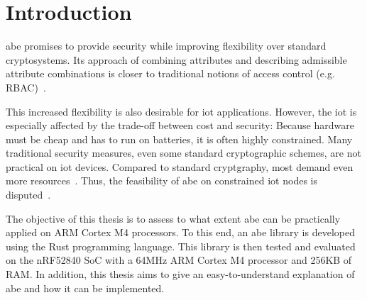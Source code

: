 
\chapter{Introduction}\label{chapter:introduction}





\acrfull{abe} promises to provide security while improving flexibility over standard cryptosystems.
Its approach of combining \glspl{attribute} and  describing admissible attribute combinations is closer to traditional notions of access control (e.g. RBAC)~\cite{bethencourt_ciphertext-policy_2007}. %

This increased flexibility is also desirable for \acrshort{iot} applications.
However, the \acrfull{iot} is especially affected by the trade-off between cost and security:
Because hardware must be cheap and has to run on batteries, it is often highly constrained.
Many traditional security measures, even some standard cryptographic schemes, are not practical on \acrshort{iot} devices.
Compared to standard cryptgraphy, most  demand even more resources~\cite{wang_performance_2014}.
Thus, the feasibility of \acrshort{abe} on constrained \acrshort{iot} nodes is disputed~\cite{wang_performance_2014,ambrosin_feasibility_2016,ambrosin_feasibility_2015,girgenti_feasibility_2019,borgh_attribute-based_2016}.

The objective of this thesis is to assess to what extent \acrshort{abe} can be practically applied on ARM Cortex M4 processors.
To this end, an \acrshort{abe} library is developed using the Rust programming language.
This library is then tested and evaluated on the nRF52840 SoC with a 64MHz ARM Cortex M4 processor and 256KB of RAM.
In addition, this thesis aims to give an easy-to-understand explanation of \acrshort{abe} and how it can be implemented.


